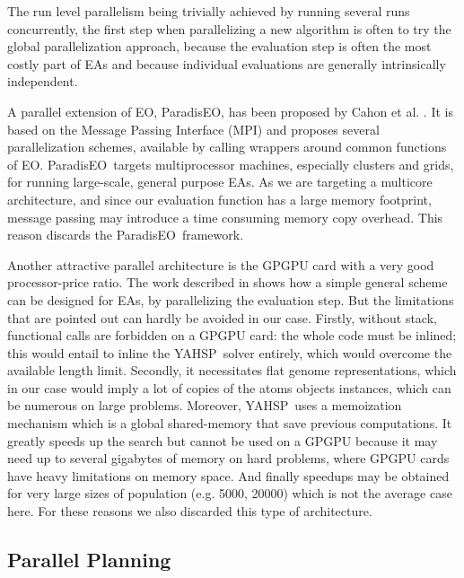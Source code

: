 \documentclass{sig-alternate}
\newcommand{\YAHSP}{{\sc YAHSP}}
\newcommand{\PARADISEO}{{\sc ParadisEO}}
\begin{document}
The run level parallelism being trivially achieved by running several runs
concurrently, the first step when parallelizing a new algorithm is often to try
the global parallelization approach, because the evaluation step is often the
most costly part of EAs and because individual evaluations are generally
intrinsically independent.

A parallel extension of EO, \PARADISEO, has been proposed by Cahon et al.
\cite{paradiseo:JHeuristics2004}. It is based on the Message Passing Interface
(MPI) and proposes several parallelization schemes, available by calling
wrappers around common functions of EO. \PARADISEO\ targets multiprocessor
machines, especially clusters and grids, for running large-scale, general
purpose EAs. As we are targeting a multicore architecture, and since our
evaluation function has a large memory footprint, message passing may introduce
a time consuming memory copy overhead. This reason discards the \PARADISEO\
framework.

Another attractive parallel architecture is the GPGPU card with a very good
processor-price ratio. The work described in \cite{maitre:gecco2009} shows how a
simple general scheme can be designed for EAs, by parallelizing the evaluation
step. But the limitations that are pointed out can hardly be avoided in our
case. Firstly, without stack, functional calls are forbidden on a GPGPU card:
the whole code must be inlined; this would entail to inline the \YAHSP\
solver entirely, which would overcome the available length limit. Secondly,
it necessitates flat genome representations, which in our case would imply
a lot of copies of the atoms objects instances, which can be numerous on
large problems. Moreover, \YAHSP\ uses a memoization mechanism which is a
global shared-memory that save previous computations. It greatly speeds up
the search but cannot be used on a GPGPU because it may need up to several
gigabytes of memory on hard problems, where GPGPU cards have heavy
limitations on memory space. And finally speedups may be obtained for very large
sizes of population (e.g. 5000, 20000) which is not the average case here.
For these reasons we also discarded this type of architecture.

\subsection{Parallel Planning}
\label{section:previous-work}
\end{document}
